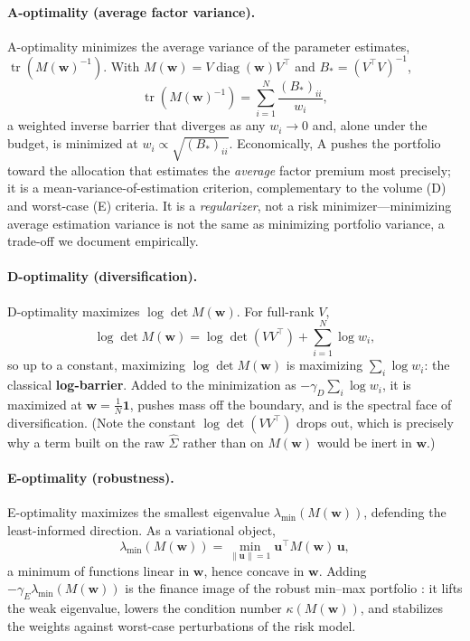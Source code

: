 \documentclass[11pt]{article}
\newcommand{\Sighat}{\hat\Sigma}
\newcommand{\tr}{\operatorname{tr}}
\newcommand{\diag}{\operatorname{diag}}
\newcommand{\one}{\mathbf{1}}
\newcommand{\w}{\mathbf{w}}
\newcommand{\uu}{\mathbf{u}}
\newcommand{\M}{M(\w)}
\newcommand{\lammin}{\lambda_{\min}}
\begin{document}
\paragraph{A-optimality (average factor variance).} A-optimality minimizes the
average variance of the parameter estimates, $\tr(\M^{-1})$. With
$\M=V\diag(\w)V^\top$ and $B_{\!*}=(V^\top V)^{-1}$,
\[
  \tr(\M^{-1})=\sum_{i=1}^{N}\frac{(B_{\!*})_{ii}}{w_i},
\]
a weighted inverse barrier that diverges as any $w_i\to0$ and, alone under the
budget, is minimized at $w_i\propto\sqrt{(B_{\!*})_{ii}}$. Economically, A pushes
the portfolio toward the allocation that estimates the \emph{average} factor
premium most precisely; it is a mean-variance-of-estimation criterion,
complementary to the volume (D) and worst-case (E) criteria. It is a
\emph{regularizer}, not a risk minimizer---minimizing average estimation variance
is not the same as minimizing portfolio variance, a trade-off we document
empirically.

\paragraph{D-optimality (diversification).} D-optimality maximizes $\log\det\M$.
For full-rank $V$,
\[
  \log\det\M=\log\det(VV^\top)+\sum_{i=1}^{N}\log w_i,
\]
so up to a constant, maximizing $\log\det\M$ is maximizing $\sum_i\log w_i$: the
classical \textbf{log-barrier}. Added to the minimization as
$-\gamma_D\sum_i\log w_i$, it is maximized at $\w=\tfrac1N\one$, pushes mass off
the boundary, and is the spectral face of diversification. (Note the constant
$\log\det(VV^\top)$ drops out, which is precisely why a term built on the raw
$\Sighat$ rather than on $\M$ would be inert in $\w$.)

\paragraph{E-optimality (robustness).} E-optimality maximizes the smallest
eigenvalue $\lammin(\M)$, defending the least-informed direction. As a
variational object,
\[
  \lammin(\M)=\min_{\lVert\uu\rVert=1}\uu^\top\M\,\uu,
\]
a minimum of functions linear in $\w$, hence concave in $\w$. Adding
$-\gamma_E\lammin(\M)$ is the finance image of the robust min--max portfolio
\cite{goldfarb2003}: it lifts the weak eigenvalue, lowers the condition number
$\kappa(\M)$, and stabilizes the weights against worst-case perturbations of the
risk model.
\end{document}
